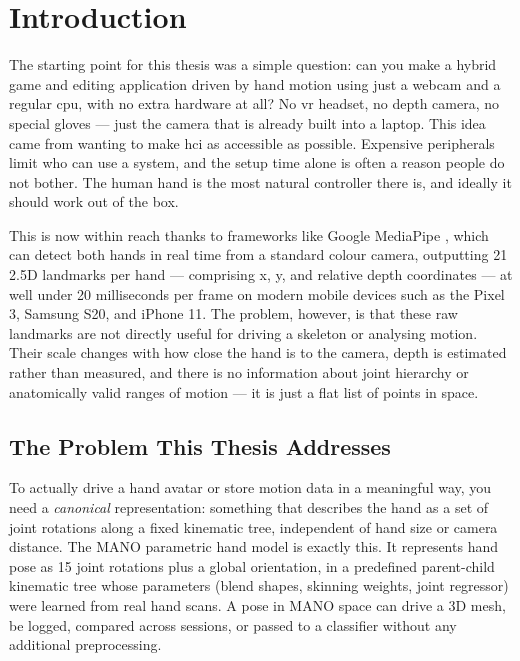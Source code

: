 
\section{Introduction}\label{sec:introduction}

The starting point for this thesis was a simple question: can you make a
hybrid game and editing application driven by hand motion using just a webcam and
a regular \acrshort{cpu}, with no extra hardware at all? No \acrshort{vr} headset,
no depth camera, no special gloves --- just the camera that is already built into a laptop.
This idea came from wanting to make \acrshort{hci} as accessible as possible.
Expensive peripherals limit who can use a system, and the setup time alone is
often a reason people do not bother. The human hand is the most natural
controller there is, and ideally it should work out of the box.

This is now within reach thanks to frameworks like Google MediaPipe
\cite{zhang2020mediapipehands}, which can detect both hands in real time
from a standard colour camera, outputting 21 2.5D landmarks per hand ---
comprising x, y, and relative depth coordinates --- at well under 20 milliseconds
per frame on modern mobile devices such as the Pixel 3, Samsung S20, and iPhone 11.
The problem, however, is that these raw landmarks are not directly
useful for driving a skeleton or analysing motion. Their scale changes with
how close the hand is to the camera, depth is estimated rather than measured,
and there is no information about joint hierarchy or anatomically valid
ranges of motion --- it is just a flat list of points in space.

\subsection{The Problem This Thesis Addresses}\label{subsec:gap}

To actually drive a hand avatar or store motion data in a meaningful way,
you need a \emph{canonical} representation: something that describes the
hand as a set of joint rotations along a fixed kinematic tree, independent
of hand size or camera distance. The MANO parametric hand model
\cite{MANO:SIGGRAPHASIA:2017} is exactly this. It represents hand pose
as 15 joint rotations plus a global orientation, in a predefined parent-child
kinematic tree whose parameters (blend shapes, skinning weights, joint regressor)
were learned from real hand scans. A pose in MANO space can drive a 3D mesh,
be logged, compared across sessions, or passed to a classifier without
any additional preprocessing.

